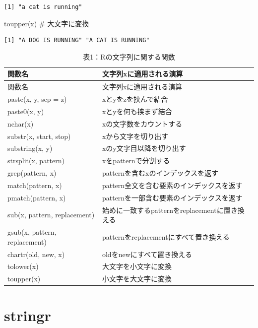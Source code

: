\documentclass[
  letterpaper,
  DIV=11,
  numbers=noendperiod]{scrreprt}
\newenvironment{Shaded}{\begin{snugshade}}{\end{snugshade}}
\newcommand{\CommentTok}[1]{\textcolor[rgb]{0.37,0.37,0.37}{#1}}
\newcommand{\FunctionTok}[1]{\textcolor[rgb]{0.28,0.35,0.67}{#1}}
\newcommand{\NormalTok}[1]{\textcolor[rgb]{0.00,0.23,0.31}{#1}}
\begin{document}
\begin{verbatim}
[1] "a cat is running"
\end{verbatim}

\begin{Shaded}
\begin{Highlighting}[]
\FunctionTok{toupper}\NormalTok{(x) }\CommentTok{\# 大文字に変換}
\end{Highlighting}
\end{Shaded}

\begin{verbatim}
[1] "A DOG IS RUNNING" "A CAT IS RUNNING"
\end{verbatim}

\begin{longtable}[]{@{}ll@{}}
\caption{表1：Rの文字列に関する関数}\tabularnewline
\toprule()
関数名 & 文字列xに適用される演算 \\
\midrule()
\endfirsthead
\toprule()
関数名 & 文字列xに適用される演算 \\
\midrule()
\endhead
paste(x, y, sep = z) & xとyをzを挟んで結合 \\
paste0(x, y) & xとyを何も挟まず結合 \\
nchar(x) & xの文字数をカウントする \\
substr(x, start, stop) & xから文字を切り出す \\
substring(x, y) & xのy文字目以降を切り出す \\
strsplit(x, pattern) & xをpatternで分割する \\
grep(pattern, x) & patternを含むxのインデックスを返す \\
match(pattern, x) & pattern全文を含む要素のインデックスを返す \\
pmatch(pattern, x) & patternを一部含む要素のインデックスを返す \\
sub(x, pattern, replacement) &
始めに一致するpatternをreplacementに置き換える \\
gsub(x, pattern, replacement) &
patternをreplacementにすべて置き換える \\
chartr(old, new, x) & oldをnewにすべて置き換える \\
tolower(x) & 大文字を小文字に変換 \\
toupper(x) & 小文字を大文字に変換 \\
\bottomrule()
\end{longtable}

\hypertarget{stringr}{%
\section{stringr}\label{stringr}}
\end{document}
